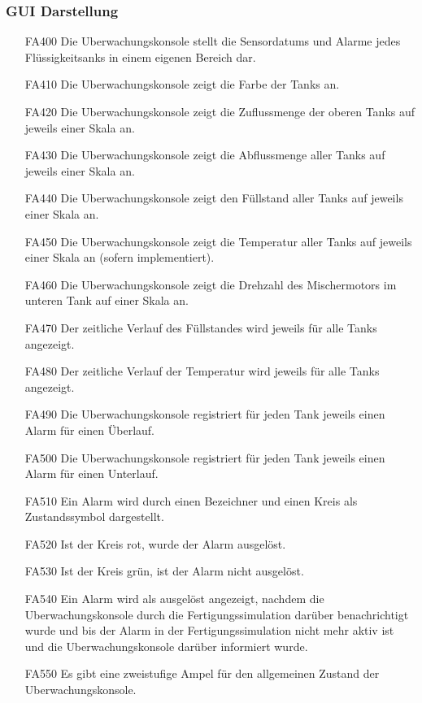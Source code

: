 \documentclass[parskip=full]{scrartcl}
\begin{document}
\subsubsection{GUI Darstellung}
\begin{enumerate}
\item[FA400] Die \gls{Uberwachungskonsole} stellt die \glspl{Sensordatum} und Alarme jedes Flüssigkeitsanks in einem eigenen Bereich dar.
\item[FA410] Die \gls{Uberwachungskonsole} zeigt die Farbe der Tanks an.
\item[FA420] Die \gls{Uberwachungskonsole} zeigt die Zuflussmenge der oberen Tanks auf jeweils einer Skala an.
\item[FA430] Die \gls{Uberwachungskonsole} zeigt die Abflussmenge aller Tanks auf jeweils einer Skala an.
\item[FA440] Die \gls{Uberwachungskonsole} zeigt den Füllstand aller Tanks auf jeweils einer Skala an.
\item[FA450] Die \gls{Uberwachungskonsole} zeigt die Temperatur aller Tanks auf jeweils einer Skala an (sofern implementiert).
\item[FA460] Die \gls{Uberwachungskonsole} zeigt die Drehzahl des Mischermotors im unteren Tank auf einer Skala an.
\item[FA470] Der zeitliche Verlauf des Füllstandes wird jeweils für alle Tanks angezeigt.
\item[FA480] Der zeitliche Verlauf der Temperatur wird jeweils für alle Tanks angezeigt.
\item[FA490] Die \gls{Uberwachungskonsole} registriert für jeden Tank jeweils einen Alarm für einen Überlauf.
\item[FA500] Die \gls{Uberwachungskonsole} registriert für jeden Tank jeweils einen Alarm für einen Unterlauf.
\item[FA510] Ein Alarm wird durch einen Bezeichner und einen Kreis als Zustandssymbol dargestellt.
\item[FA520] Ist der Kreis rot, wurde der Alarm ausgelöst.
\item[FA530] Ist der Kreis grün, ist der Alarm nicht ausgelöst.
\item[FA540] Ein Alarm wird als ausgelöst angezeigt, nachdem die \gls{Uberwachungskonsole} durch die \gls{Fertigungssimulation} darüber benachrichtigt wurde und bis der Alarm in der
  \gls{Fertigungssimulation} nicht mehr aktiv ist und die \gls{Uberwachungskonsole} darüber informiert wurde.
\item[FA550] Es gibt eine zweistufige Ampel für den allgemeinen Zustand der \gls{Uberwachungskonsole}.

\end{enumerate}
\end{document}
